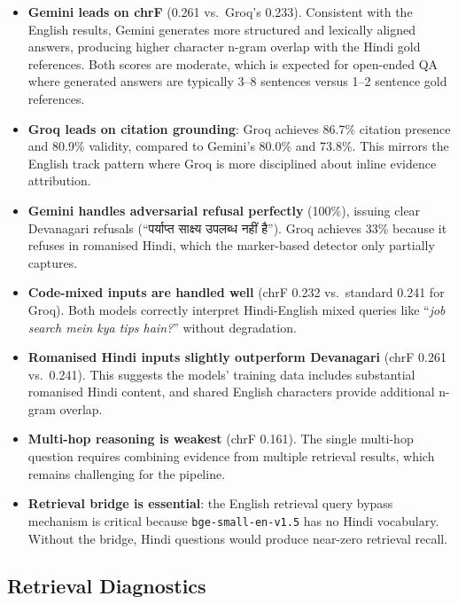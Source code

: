 \documentclass[11pt,a4paper]{article}
\begin{document}
\begin{itemize}[leftmargin=*]
  \item \textbf{Gemini leads on chrF} (0.261 vs.\ Groq's 0.233). Consistent with the English results, Gemini generates more structured and lexically aligned answers, producing higher character n-gram overlap with the Hindi gold references. Both scores are moderate, which is expected for open-ended QA where generated answers are typically 3--8 sentences versus 1--2 sentence gold references.
  
  \item \textbf{Groq leads on citation grounding}: Groq achieves 86.7\% citation presence and 80.9\% validity, compared to Gemini's 80.0\% and 73.8\%. This mirrors the English track pattern where Groq is more disciplined about inline evidence attribution.
  
  \item \textbf{Gemini handles adversarial refusal perfectly} (100\%), issuing clear Devanagari refusals (``\texthindi{पर्याप्त साक्ष्य उपलब्ध नहीं है}''). Groq achieves 33\% because it refuses in romanised Hindi, which the marker-based detector only partially captures.
  
  \item \textbf{Code-mixed inputs are handled well} (chrF 0.232 vs.\ standard 0.241 for Groq). Both models correctly interpret Hindi-English mixed queries like ``\textit{job search mein kya tips hain?}'' without degradation.
  
  \item \textbf{Romanised Hindi inputs slightly outperform Devanagari} (chrF 0.261 vs.\ 0.241). This suggests the models' training data includes substantial romanised Hindi content, and shared English characters provide additional n-gram overlap.
  
  \item \textbf{Multi-hop reasoning is weakest} (chrF 0.161). The single multi-hop question requires combining evidence from multiple retrieval results, which remains challenging for the pipeline.
  
  \item \textbf{Retrieval bridge is essential}: the English retrieval query bypass mechanism is critical because \texttt{bge-small-en-v1.5} has no Hindi vocabulary. Without the bridge, Hindi questions would produce near-zero retrieval recall.
\end{itemize}

\subsection{Retrieval Diagnostics}
\end{document}
